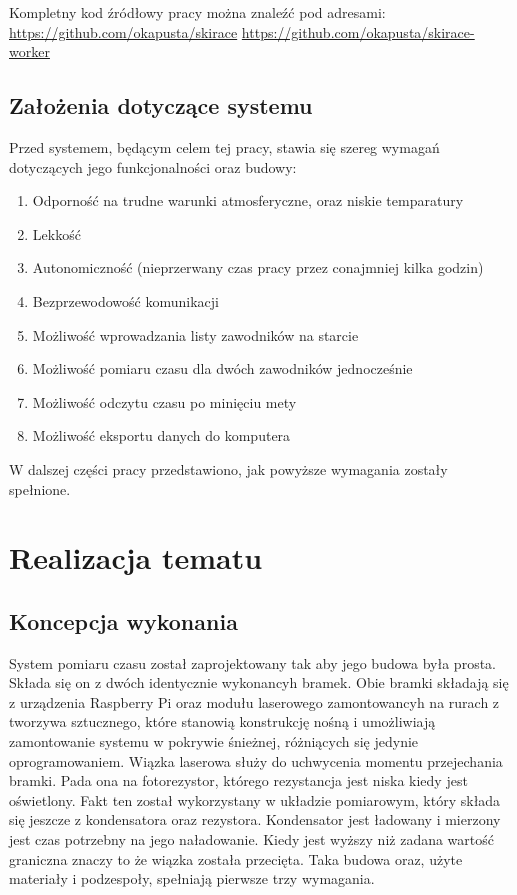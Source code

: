 \documentclass[11pt,a4paper, twoside]{article}
\begin{document}
\noindent
Kompletny kod źródłowy pracy można znaleźć pod adresami:
\newline
\url{https://github.com/okapusta/skirace}
\newline
\url{https://github.com/okapusta/skirace-worker}

\newpage

\newpage
\noindent
\subsection{Założenia dotyczące systemu}
Przed systemem, będącym celem tej pracy, stawia się szereg wymagań dotyczących jego funkcjonalności oraz budowy:

\begin{enumerate}
\item Odporność na trudne warunki atmosferyczne, oraz niskie temparatury
\item Lekkość
\item Autonomiczność (nieprzerwany czas pracy przez conajmniej kilka godzin)
\item Bezprzewodowość komunikacji
\item \label{req:entry} Możliwość wprowadzania listy zawodników na starcie
\item \label{req:two} Możliwość pomiaru czasu dla dwóch zawodników jednocześnie
\item \label{req:lcd} Możliwość odczytu czasu po minięciu mety 
\item \label{req:export} Możliwość eksportu danych do komputera
\end{enumerate}
\noindent
W dalszej części pracy przedstawiono, jak powyższe wymagania zostały spełnione.
\newpage
\section{Realizacja tematu}
\subsection{Koncepcja wykonania}\label{concept}
System pomiaru czasu został zaprojektowany tak aby jego budowa była prosta. Składa się on z dwóch identycznie wykonancyh bramek. Obie bramki składają się z urządzenia Raspberry Pi oraz modułu laserowego zamontowancyh na rurach z tworzywa sztucznego, które stanowią konstrukcję nośną i umożliwiają zamontowanie systemu w pokrywie śnieżnej, różniących się jedynie oprogramowaniem. Wiązka laserowa służy do uchwycenia momentu przejechania bramki. Pada ona na fotorezystor, którego rezystancja jest niska kiedy jest oświetlony. Fakt ten został wykorzystany w układzie pomiarowym, który składa się jeszcze z kondensatora oraz rezystora. Kondensator jest ładowany i mierzony jest czas potrzebny na jego naładowanie. Kiedy jest wyższy niż zadana wartość graniczna znaczy to że wiązka została przecięta. Taka budowa oraz, użyte materiały i podzespoły, spełniają pierwsze trzy wymagania.
\end{document}
